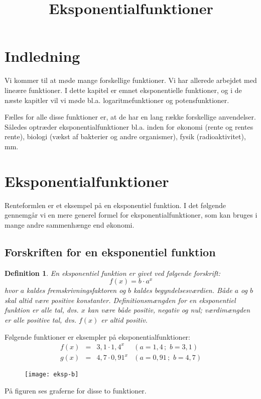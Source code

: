 \documentclass[12pt,oneside,a4paper]{article}
\title{Eksponentialfunktioner}
\date{\vspace{-5ex}}
\theoremstyle{plain}
\newtheorem*{mydef}{Definition}
\begin{document}
\maketitle

\section*{Indledning}
Vi kommer til at møde mange forskellige funktioner. Vi har allerede
arbejdet med lineære funktioner. I dette kapitel er emnet eksponentielle
funktioner, og i de næste kapitler vil vi møde bl.a. logaritmefunktioner og
potensfunktioner.

Fælles for alle disse funktioner er, at de har en lang række forskellige
anvendelser. Således optræder eksponentialfunktioner bl.a. inden for økonomi
(rente og rentes rente), biologi (vækst af bakterier og andre organismer),
fysik (radioaktivitet), mm.

\section*{Eksponentialfunktioner}
Renteformlen er et eksempel på en eksponentiel funktion. I det følgende
gennemgår vi en mere generel formel for eksponentialfunktioner, som kan
bruges i mange andre sammenhænge end økonomi.

\subsection*{Forskriften for en eksponentiel funktion}
\begin{mydef}
    En eksponentiel funktion er givet ved følgende forskrift:
    $$
    f(x) = b\cdot a^x
    $$
    hvor $a$ kaldes {\em fremskrivningsfaktoren} og $b$ kaldes {\em
    begyndelsesværdien}. Både $a$ og $b$ skal altid være positive konstanter.
    Definitionsmængden for en eksponentiel funktion er alle tal, dvs. $x$ kan
    være både positiv, negativ og nul; værdimængden er alle positive tal, dvs.
    $f(x)$ er altid positiv.
\end{mydef}

Følgende funktioner er eksempler på eksponentialfunktioner:
$$
\begin{array}{rcll}
    f(x) &=& 3,1 \cdot 1,4^x & ( a=1,4  \, ; \, \, b=3,1) \\
    g(x) &=& 4,7 \cdot 0,91^x & (a=0,91 \, ; \, \, b=4,7) 
\end{array}
$$

\begin{figure}[ht]
    \centering
    \texttt{[image: eksp-b]}
    \label{eksp-b}
\end{figure}
På figuren ses graferne for disse to funktioner.
\end{document}
